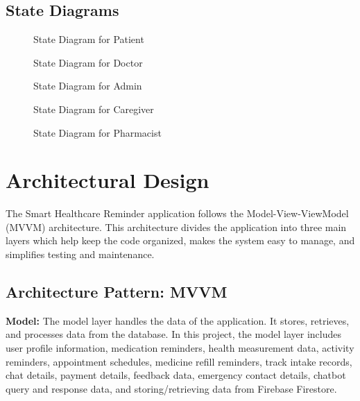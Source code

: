 \subsection{State Diagrams}

\begin{figure}[H]
\centering
\caption{State Diagram for Patient}
\label{fig:state-patient}
\end{figure}

\begin{figure}[H]
\centering
\caption{State Diagram for Doctor}
\label{fig:state-doctor}
\end{figure}

\begin{figure}[H]
\centering
\caption{State Diagram for Admin}
\label{fig:state-admin}
\end{figure}

\begin{figure}[H]
\centering
\caption{State Diagram for Caregiver}
\label{fig:state-caregiver}
\end{figure}

\begin{figure}[H]
\centering
\caption{State Diagram for Pharmacist}
\label{fig:state-pharmacist}
\end{figure}

\section{Architectural Design}

The Smart Healthcare Reminder application follows the Model-View-ViewModel (MVVM) architecture. This architecture divides the application into three main layers which help keep the code organized, makes the system easy to manage, and simplifies testing and maintenance.

\subsection{Architecture Pattern: MVVM}

\textbf{Model:} The model layer handles the data of the application. It stores, retrieves, and processes data from the database. In this project, the model layer includes user profile information, medication reminders, health measurement data, activity reminders, appointment schedules, medicine refill reminders, track intake records, chat details, payment details, feedback data, emergency contact details, chatbot query and response data, and storing/retrieving data from Firebase Firestore.

